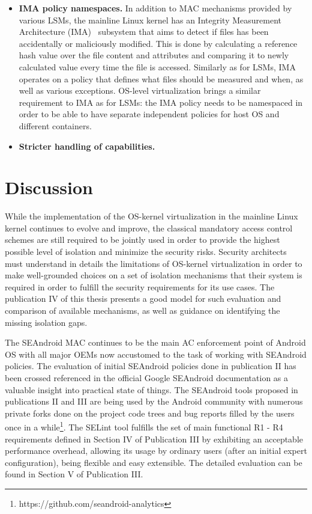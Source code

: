 \begin{itemize}
	\item \textbf{IMA policy namespaces.} In addition to MAC mechanisms provided by various LSMs, the mainline Linux kernel has an Integrity Measurement Architecture (IMA)~\cite{ima} subsystem that aims to detect if files has been accidentally or maliciously modified. This is done by calculating a reference hash value over the file content and attributes and comparing it to newly calculated value every time the file is accessed. Similarly as for LSMs, IMA operates on a policy that defines what files should be measured and when, as well as various exceptions. OS-level virtualization brings a similar requirement to IMA as for LSMs: the IMA policy needs to be namespaced in order to be able to have separate independent policies for host OS and different containers. 
	\item \textbf{Stricter handling of capabilities.} 
\end{itemize}


\section{Discussion}

While the implementation of the OS-kernel virtualization in the mainline Linux kernel continues to evolve and improve, the classical mandatory access control schemes are still required to be jointly used in order to provide the highest possible level of isolation and minimize the security risks. Security architects must understand in details the limitations of OS-kernel virtualization in order to make well-grounded choices on a set of isolation mechanisms that their system is required in order to fulfill the security requirements for its use cases. The publication IV of this thesis presents a good model for such evaluation and comparison of available mechanisms, as well as guidance on identifying the missing isolation gaps. 

The SEAndroid MAC continues to be the main AC enforcement point of Android OS with all major OEMs now accustomed to the task of working with SEAndroid policies. The evaluation of initial SEAndroid policies done in publication II has been crossed referenced in the official Google SEAndroid documentation as a valuable insight into practical state of things. The SEAndroid tools proposed in publications II and III are being used by the Android community with numerous private forks done on the project code trees and bug reports filled by the users once in a while\footnote{https://github.com/seandroid-analytics}. The SELint tool fulfills the set of main functional R1 - R4 requirements defined in Section IV of Publication III by exhibiting an acceptable performance overhead, allowing its usage by ordinary users (after an initial expert configuration), being flexible and easy extensible. The detailed evaluation can be found in Section V of Publication III. 



